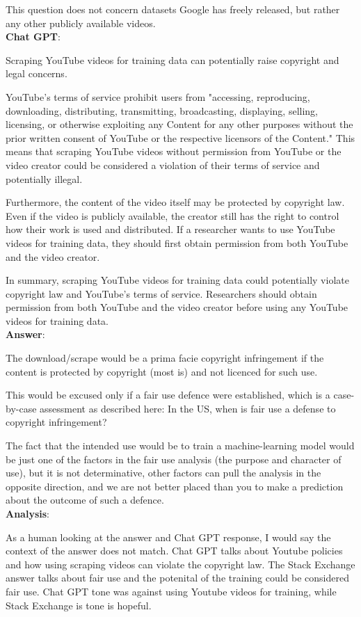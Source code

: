 \documentclass{article}
\begin{document}
This question does not concern datasets Google has freely released, but rather any other publicly available videos. \\

\textbf{Chat GPT}:

Scraping YouTube videos for training data can potentially raise copyright and legal concerns.

YouTube's terms of service prohibit users from "accessing, reproducing, downloading, distributing, transmitting, broadcasting, displaying, selling, licensing, or otherwise exploiting any Content for any other purposes without the prior written consent of YouTube or the respective licensors of the Content." This means that scraping YouTube videos without permission from YouTube or the video creator could be considered a violation of their terms of service and potentially illegal.

Furthermore, the content of the video itself may be protected by copyright law. Even if the video is publicly available, the creator still has the right to control how their work is used and distributed. If a researcher wants to use YouTube videos for training data, they should first obtain permission from both YouTube and the video creator.

In summary, scraping YouTube videos for training data could potentially violate copyright law and YouTube's terms of service. Researchers should obtain permission from both YouTube and the video creator before using any YouTube videos for training data. \\

\textbf{Answer}:

The download/scrape would be a prima facie copyright infringement if the content is protected by copyright (most is) and not licenced for such use.

This would be excused only if a fair use defence were established, which is a case-by-case assessment as described here: In the US, when is fair use a defense to copyright infringement?

The fact that the intended use would be to train a machine-learning model would be just one of the factors in the fair use analysis (the purpose and character of use), but it is not determinative, other factors can pull the analysis in the opposite direction, and we are not better placed than you to make a prediction about the outcome of such a defence. \\

\textbf{Analysis}:

As a human looking at the answer and Chat GPT response, I would say the context of the answer does not match. Chat GPT talks about Youtube policies and how using scraping videos can violate the copyright law. The Stack Exchange answer talks about fair use and the potenital of the training could be considered fair use. Chat GPT tone was against using Youtube videos for training, while Stack Exchange is tone is hopeful.
\end{document}

